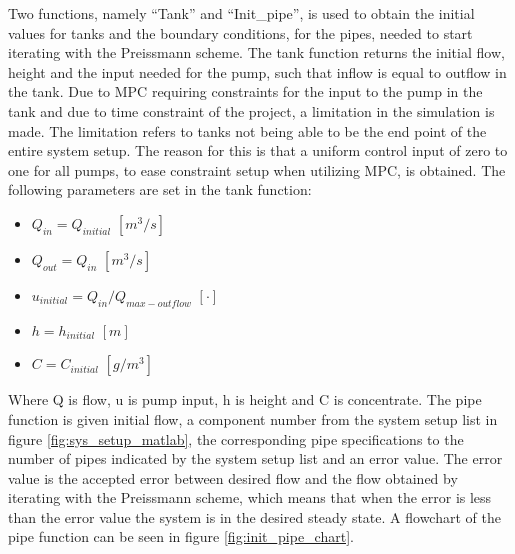 Two functions, namely ``Tank'' and ``Init\_pipe'', is used to obtain the initial values for tanks and the boundary conditions, for the pipes, needed to start iterating with the Preissmann scheme. The tank function returns the initial flow, height and the input needed for the pump, such that inflow is equal to outflow in the tank. Due to MPC requiring constraints for the input to the pump in the tank and due to time constraint of the project, a limitation in the simulation is made. The limitation refers to tanks not being able to be the end point of the entire system setup. The reason for this is that a uniform control input of zero to one for all pumps, to ease constraint setup when utilizing MPC, is obtained. The following parameters are set in the tank function:
\begin{itemize}
	\item $Q_{in} = Q_{initial}$ $[m^3/s]$
	\item $Q_{out} = Q_{in}$ $[m^3/s]$
	\item $u_{initial} = Q_{in}/Q_{max-outflow}$ $[\cdot]$
	\item $h = h_{initial}$ $[m]$
	\item $C = C_{initial}$ $[g/m^3]$
\end{itemize}

Where Q is flow, u is pump input, h is height and C is concentrate.
The pipe function is given initial flow, a component number from the system setup list in figure \ref{fig:sys_setup_matlab}, the corresponding pipe specifications to the number of pipes indicated by the system setup list and an error value. The error value is the accepted error between desired flow and the flow obtained by iterating with the Preissmann scheme, which means that when the error is less than the error value the system is in the desired steady state. A flowchart of the pipe function can be seen in figure \ref{fig:init_pipe_chart}. 

